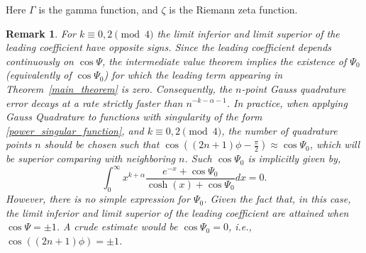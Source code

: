 \documentclass[11pt]{article}
\newtheorem{remark}{Remark}
\begin{document}
Here $\Gamma$ is the gamma function, and $\zeta$ is the Riemann zeta function.
\begin{remark}
    For $k\equiv 0,2\pmod 4$ the limit inferior and limit superior of the leading coefficient have opposite signs. Since the leading coefficient depends continuously on $\cos\Psi$, the intermediate value theorem implies the existence of $\Psi_0$ (equivalently of $\cos\Psi_0$) for which the leading term appearing in Theorem~\ref{main_theorem} is zero. Consequently, the $n$-point Gauss quadrature error decays at a rate strictly faster than $n^{-k-\alpha-1}$. In practice, when applying Gauss Quadrature to functions with singularity of the form \eqref{power_singular_function}, and $k\equiv 0,2\pmod 4$, the number of quadrature points $n$ should be chosen such that $\cos((2n+1)\phi-\frac{\pi}{2}) \approx \cos \Psi_0$, which will be superior comparing with neighboring $n$. Such $\cos \Psi_0$ is implicitly given by,
    \begin{equation}
        \int_{0}^{\infty} x^{k+\alpha} \frac{  e^{-x} + \cos \Psi_0 }{\cosh(x) + \cos \Psi_0} dx = 0.
    \end{equation}
    However, there is no simple expression for $\Psi_0$. Given the fact that, in this case, the limit inferior and limit superior of the leading coefficient are attained when $\cos \Psi =\pm 1$. A crude estimate would be $\cos \Psi_0 =0$, i.e., $\cos((2n+1)\phi) = \pm 1$. \label{good_02}
\end{remark}
\end{document}
